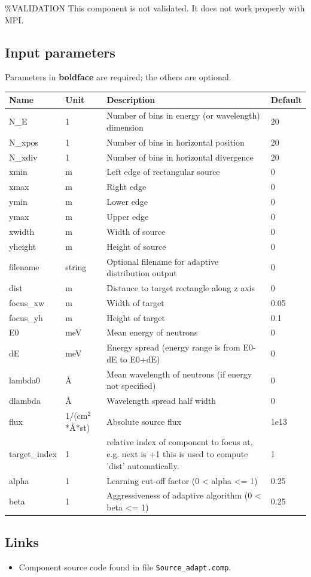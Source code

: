 \%VALIDATION This component is not validated. It does not work properly with MPI.

\subsection*{Input parameters}
Parameters in \textbf{boldface} are required; the others are optional.

\begin{longtable}{p{}p{}p{}p{}}
\toprule
\textbf{Name} & \textbf{Unit} & \textbf{Description} & \textbf{Default} \\
\midrule
\endhead
N\_E & 1 & Number of bins in energy (or wavelength) dimension & 20 \\
N\_xpos & 1 & Number of bins in horizontal position & 20 \\
N\_xdiv & 1 & Number of bins in horizontal divergence & 20 \\
xmin & m & Left edge of rectangular source & 0 \\
xmax & m & Right edge & 0 \\
ymin & m & Lower edge & 0 \\
ymax & m & Upper edge & 0 \\
xwidth & m & Width of source & 0 \\
yheight & m & Height of source & 0 \\
filename & string & Optional filename for adaptive distribution output & 0 \\
dist & m & Distance to target rectangle along z axis & 0 \\
focus\_xw & m & Width of target & 0.05 \\
focus\_yh & m & Height of target & 0.1 \\
E0 & meV & Mean energy of neutrons & 0 \\
dE & meV & Energy spread (energy range is from E0-dE to E0+dE) & 0 \\
lambda0 & \AA{} & Mean wavelength of neutrons (if energy not specified) & 0 \\
dlambda & \AA{} & Wavelength spread half width & 0 \\
flux & 1/(cm$^{2}$*\AA{}*st) & Absolute source flux & 1e13 \\
target\_index & 1 & relative index of component to focus at, e.g. next is +1 this is used to compute 'dist' automatically. & 1 \\
alpha & 1 & Learning cut-off factor (0 \textless{} alpha \textless{}= 1) & 0.25 \\
beta & 1 & Aggressiveness of adaptive algorithm (0 \textless{} beta \textless{}= 1) & 0.25 \\
\bottomrule
\end{longtable}

\subsection*{Links}
\begin{itemize}
  \item Component source code found in file \texttt{Source\_adapt.comp}.
\end{itemize}
